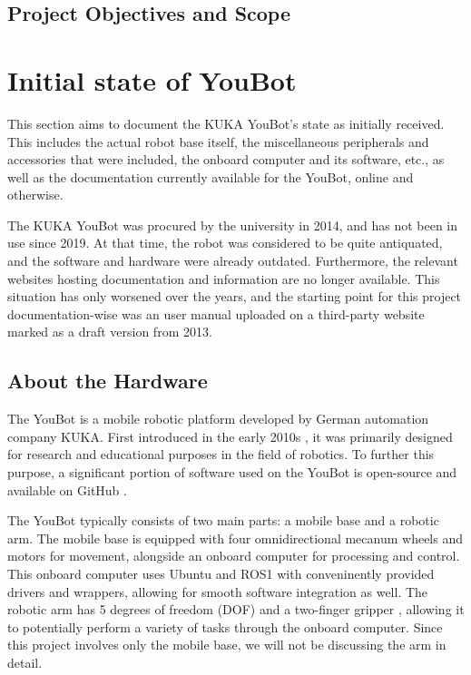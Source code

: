 \documentclass[a4paper, 12pt]{article}
\newif\ifshownotes
\newcommand{\notes}[1]{\ifshownotes\textcolor{blue}{#1}\fi}
\begin{document}
    \subsection{Project Objectives and Scope}

        

    \pagebreak

    \section{Initial state of YouBot}

    This section aims to document the KUKA YouBot's state as initially received. This includes the actual robot base itself, the miscellaneous peripherals and accessories that were included, the onboard computer and its software, etc., as well as the documentation currently available for the YouBot, online and otherwise. 

    The KUKA YouBot was procured by the university in 2014, and has not been in use since 2019. At that time, the robot was considered to be quite antiquated, and the software and hardware were already outdated. Furthermore, the relevant websites hosting documentation and information are no longer available. This situation has only worsened over the years, and the starting point for this project documentation-wise was an user manual uploaded on a third-party website marked as a draft version from 2013.

    \subsection{About the Hardware}

    The YouBot is a mobile robotic platform developed by German automation company KUKA. First introduced in the early 2010s \notes{[cite]}, it was primarily designed for research and educational purposes in the field of robotics. To further this purpose, a significant portion of software used on the YouBot is open-source and available on GitHub \notes{[cite]}. 

    The YouBot typically consists of two main parts: a mobile base and a robotic arm. The mobile base is equipped with four omnidirectional mecanum wheels and motors for movement, alongside an onboard computer for processing and control. This onboard computer uses Ubuntu and ROS1 with conveninently provided drivers and wrappers, allowing for smooth software integration as well. The robotic arm has 5 degrees of freedom (DOF) and a two-finger gripper \notes{[cite]}, allowing it to potentially perform a variety of tasks through the onboard computer. Since this  project involves only the mobile base, we will not be discussing the arm in detail.
\end{document}
